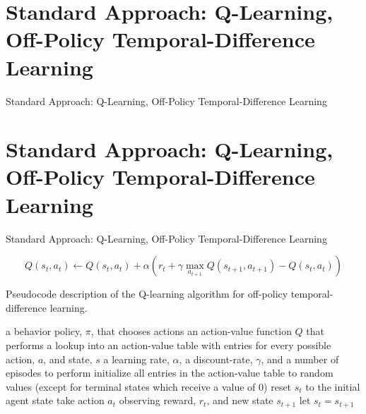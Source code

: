 \documentclass[xcolor={table}]{beamer}
\newcommand{\SectionSlide}[2][]{
	\ifthenelse{\isempty{#1}}
		{\section{#2}\begin{frame} \begin{center}\begin{huge}#2\end{huge}\end{center}\end{frame}}
		{\section[#1]{#2}\begin{frame} \begin{center}\begin{huge}#2\end{huge}\end{center}\end{frame}}
}
\begin{document}
\SectionSlide{Standard Approach: Q-Learning, Off-Policy Temporal-Difference Learning}



 \begin{frame} 
 \begin{footnotesize}
    \begin{equation}
    {Q}\left({s_t}, {a_t}\right) \leftarrow {Q}\left({s_t}, {a_t}\right) + \alpha\left({r_t} + \gamma\max_{{a_{t+1}}}{Q}\left({s_{t+1}}, a_{t+1}\right) - {Q}\left({s_t}, {a_t}\right)\right)
    \label{eqn:q_learning_alg}
     \end{equation}
     \end{footnotesize}
\end{frame} 

\begin{frame}[plain]
\scriptsize{Pseudocode description of the Q-learning algorithm for off-policy temporal-difference learning.}

\begin{footnotesize}
\begin{algorithmic}[1]
\Require a behavior policy, $\pi$, that chooses actions
\Require an action-value function $Q$ that performs a lookup into an action-value table with entries for every possible action, $a$, and state, $s$
\Require a learning rate, $\alpha$, a discount-rate, $\gamma$, and a number of episodes to perform
\State initialize all entries in the action-value table to random values (except for terminal states which receive a value of $0$)
\label{alg_ln:ql_intialise_q_table}
\State reset $s_{t}$ to the initial agent state
\label{alg_ln:ql_intialise_agent_state}
\Repeat
    \label{alg_ln:ql_choose_action}
    \State take action ${a_t}$ observing reward, ${r_t}$, and new state ${s_{t+1}}$
     \label{alg_ln:ql_take_action}
     \State let $s_t = s_{t+1}$
      \label{alg_ln:ql_update_state}
\EndFor
\end{algorithmic}
\end{footnotesize}
\end{frame}
\end{document}
